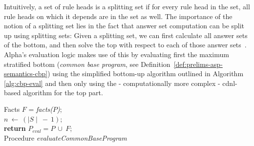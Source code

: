 Intuitively, a set of rule heads is a splitting set if for every rule head in the set, all rule heads on which it depends are in the set as well. The importance of the notion of a splitting set lies in the fact that answer set computation can be split up using splitting sets: Given a splitting set, we can first calculate all answer sets of the bottom, and then solve the top with respect to each of those answer sets~\cite{splitting-sets}.\\

Alpha's evaluation logic makes use of this by evaluating first the maximum stratified bottom (\emph{common base program}, see Definition~\ref{def:prelims-asp-semantics-cbp}) using the simplified bottom-up algorithm outlined in Algorithm \ref{alg:cbp-eval} and then only using the - computationally more complex - \gls{cdnl}-based algorithm for the top part.

\begin{algorithm}[!h]
\SetAlgoLined
{}
Facts $F$ = \emph{facts($P$)};\\
$n~\leftarrow~(\mid S \mid~-~1)$;\\
\textbf{return} $P_{eval} = P~\cup~F$;\\
\caption{Procedure \emph{evaluateCommonBaseProgram}}\label{alg:cbp-eval}
\end{algorithm}
